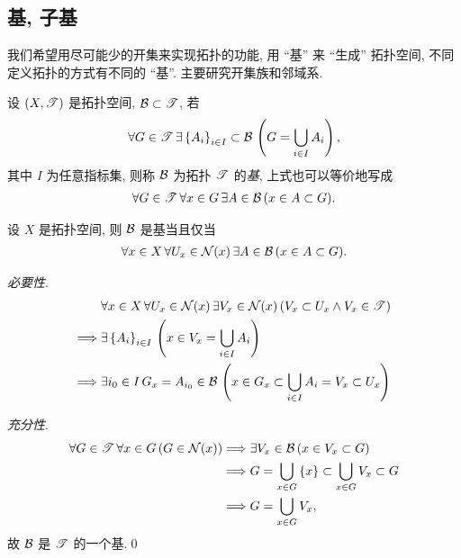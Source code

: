 \subsection{基, 子基}
    我们希望用尽可能少的开集来实现拓扑的功能, 用 ``基'' 来 ``生成'' 拓扑空间, 不同定义拓扑的方式有不同的 ``基''. 主要研究开集族和邻域系.

    \begin{Definition}[基(开集语言)]
        设 $ (X, \mathscr{T}) $ 是拓扑空间, $ \mathcal{B}\subset\mathscr{T} $, 若
        \begin{align*}
            \forall G\in\mathscr{T}\,\exists\left\{ A_{i} \right\}_{i\in I}\subset\mathcal{B}\,\left( G=\bigcup_{i\in I}A_{i} \right),
        \end{align*}
        其中 $ I $ 为任意指标集, 则称 $ \mathcal{B} $ 为拓扑 $ \mathscr{T} $ 的\emph{基}, 上式也可以等价地写成
        \begin{align*}
            \forall G\in\mathscr{T}\,\forall x\in G\,\exists A\in\mathcal{B}\,(x\in A\subset G).
        \end{align*}
    \end{Definition}
    
    \begin{Theorem}
        设 $ X $ 是拓扑空间, 则 $ \mathcal{B} $ 是基当且仅当
        \begin{align*}
            \forall x\in X\,\forall U_{x}\in\mathcal{N}(x)\,\exists A\in\mathcal{B}\,(x\in A\subset G).
        \end{align*}
    \end{Theorem}
    \begin{Proof}
        \textsl{必要性}.
        \begin{align*}
            & \forall x\in X\,\forall U_{x}\in\mathcal{N}(x)\,\exists V_{x}\in\mathcal{N}(x)\,(V_{x}\subset U_{x}\land V_{x}\in\mathscr{T})\\
            \Longrightarrow{} & \exists \left\{ A_{i} \right\}_{i\in I}\,\left(x\in V_{x}=\bigcup_{i\in I}A_{i} \right)\\
            \Longrightarrow{} & \exists i_{0}\in I\, G_{x}=A_{i_{0}}\in\mathcal{B}\,\left(x\in G_{x}\subset \bigcup_{i\in I}A_{i}=V_{x}\subset U_{x} \right)
        \end{align*}

        \textsl{充分性}.
        \begin{align*}
            \forall G\in\mathscr{T}\,\forall x\in G\,(G\in\mathcal{N}(x)) & \Longrightarrow \exists V_{x}\in\mathcal{B}\,(x\in V_{x}\subset G)\\
            & \Longrightarrow G=\bigcup_{x\in G}\left\{ x \right\}\subset \bigcup_{x\in G}V_{x}\subset G\\
            & \Longrightarrow G=\bigcup_{x\in G}V_{x},
        \end{align*}
        故 $ \mathcal{B} $ 是 $ \mathscr{T} $ 的一个基.\qed
    \end{Proof}


